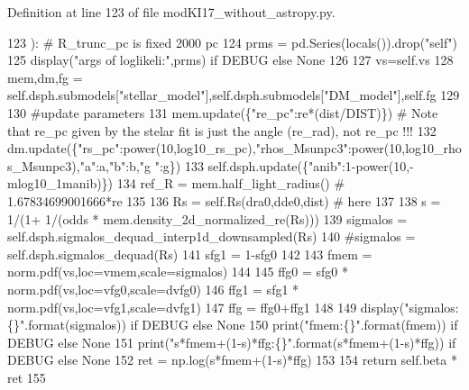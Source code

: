 Definition at line 123 of file mod\+K\+I17\+\_\+without\+\_\+astropy.\+py.


\begin{DoxyCode}
123     ): \textcolor{comment}{# R\_trunc\_pc is fixed 2000 pc}
124         prms = pd.Series(locals()).drop(\textcolor{stringliteral}{"self"})
125         display(\textcolor{stringliteral}{"args of loglikeli:"},prms) \textcolor{keywordflow}{if} DEBUG \textcolor{keywordflow}{else} \textcolor{keywordtype}{None}
126         
127         vs=self.vs
128         mem,dm,fg = self.dsph.submodels[\textcolor{stringliteral}{"stellar\_model"}],self.dsph.submodels[\textcolor{stringliteral}{"DM\_model"}],self.fg
129         
130         \textcolor{comment}{#update parameters}
131         mem.update(\{\textcolor{stringliteral}{"re\_pc"}:re*(dist/DIST)\}) \textcolor{comment}{# Note that re\_pc given by the stelar fit is just the angle
       (re\_rad), not re\_pc !!!}
132         dm.update(\{\textcolor{stringliteral}{"rs\_pc"}:power(10,log10\_rs\_pc),\textcolor{stringliteral}{"rhos\_Msunpc3"}:power(10,log10\_rhos\_Msunpc3),\textcolor{stringliteral}{"a"}:a,\textcolor{stringliteral}{"b"}:b,\textcolor{stringliteral}{"g
      "}:g\})
133         self.dsph.update(\{\textcolor{stringliteral}{"anib"}:1-power(10,-mlog10\_1manib)\})
134         ref\_R = mem.half\_light\_radius() \textcolor{comment}{# 1.67834699001666*re}
135         
136         Rs = self.Rs(dra0,dde0,dist) \textcolor{comment}{# here }
137         
138         s = 1/(1+ 1/(odds * mem.density\_2d\_normalized\_re(Rs)))
139         sigmalos = self.dsph.sigmalos\_dequad\_interp1d\_downsampled(Rs)
140         \textcolor{comment}{#sigmalos = self.dsph.sigmalos\_dequad(Rs)}
141         sfg1 = 1-sfg0
142         
143         fmem = norm.pdf(vs,loc=vmem,scale=sigmalos)
144         
145         ffg0 = sfg0 * norm.pdf(vs,loc=vfg0,scale=dvfg0)
146         ffg1 = sfg1 * norm.pdf(vs,loc=vfg1,scale=dvfg1)
147         ffg = ffg0+ffg1
148         
149         display(\textcolor{stringliteral}{"sigmalos:\{\}"}.format(sigmalos)) \textcolor{keywordflow}{if} DEBUG \textcolor{keywordflow}{else} \textcolor{keywordtype}{None}
150         print(\textcolor{stringliteral}{"fmem:\{\}"}.format(fmem)) \textcolor{keywordflow}{if} DEBUG \textcolor{keywordflow}{else} \textcolor{keywordtype}{None}
151         print(\textcolor{stringliteral}{"s*fmem+(1-s)*ffg:\{\}"}.format(s*fmem+(1-s)*ffg)) \textcolor{keywordflow}{if} DEBUG \textcolor{keywordflow}{else} \textcolor{keywordtype}{None}
152         ret = np.log(s*fmem+(1-s)*ffg)
153         
154         \textcolor{keywordflow}{return} self.beta * ret
155 
\end{DoxyCode}
